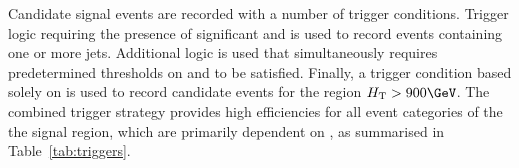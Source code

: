 Candidate signal events are recorded with a number of trigger
conditions. Trigger logic requiring the presence of significant \mht
and \met is used to record events containing one or more
jets. Additional logic is used that simultaneously requires
predetermined thresholds on \scalht and \alphat to be
satisfied. Finally, a trigger condition based solely on \scalht is
used to record candidate events for the region $\scalht >
900\GeV$. The combined trigger strategy provides high efficiencies for
all event categories of the the signal region, which are primarily
dependent on \scalht, as summarised in Table~\ref{tab:triggers}.


\clearpage



\clearpage




